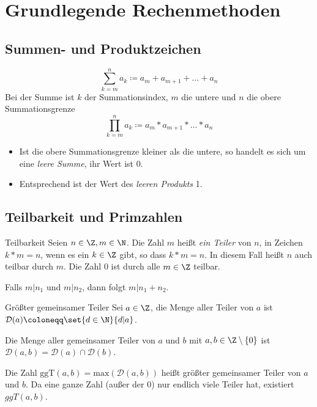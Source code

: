 \chapter{Grundlegende Rechenmethoden}
\section{Summen- und Produktzeichen}
\begin{equation*}
  \sum\limits_{k=m}^n a_k\coloneqq a_m + a_{m+1} + \ldots + a_n
\end{equation*}
Bei der Summe ist $k$ der Summationsindex, $m$ die untere und $n$ die obere Summationsgrenze
\begin{equation*}
  \prod\limits_{k=m}^n a_k\coloneqq a_m * a_{m+1} * \ldots * a_n
\end{equation*}

\bemerkung
\begin{itemize}
  \item Ist die obere Summationsgrenze kleiner als die untere, so handelt es sich um eine \emph{leere Summe}, ihr Wert ist 0.
  \item Entsprechend ist der Wert des \emph{leeren Produkts} 1.
\end{itemize}


\section{Teilbarkeit und Primzahlen}
\begin{definition}{Teilbarkeit}
	Seien $n\in\Z, m\in\N$. Die Zahl $m$ heißt \emph{ein Teiler} von $n$, in Zeichen $k* m=n$, wenn es ein $k\in\Z$ gibt, so dass $k* m = n$. In diesem Fall heißt $n$ auch teilbar durch $m$.
	Die Zahl $0$ ist durch alle $m\in\Z$ teilbar.
\end{definition}
Falls $m|n_1$ und $m|n_2$, dann folgt $m|n_1+n_2$.

\begin{definition}{Größter gemeinsamer Teiler}
	Sei $a\in\Z$, die Menge aller Teiler von $a$ ist $\mathcal{D}(a)\coloneqq\set{d\in\N}{d|a}$.

	Die Menge aller gemeinsamer Teiler von $a$ und $b$ mit $a,b\in\Z\setminus\{ 0\}$ ist $\mathcal{D}(a,b) = \mathcal{D}(a) \cap \mathcal{D}(b)$.

	Die Zahl $\mathrm{ggT}(a,b) = \mathrm{max}(\mathcal{D}(a,b))$ heißt größter gemeinsamer Teiler von $a$ und $b$. Da eine ganze Zahl (außer der $0$) nur endlich viele Teiler hat, existiert $ggT(a,b)$.
\end{definition}


